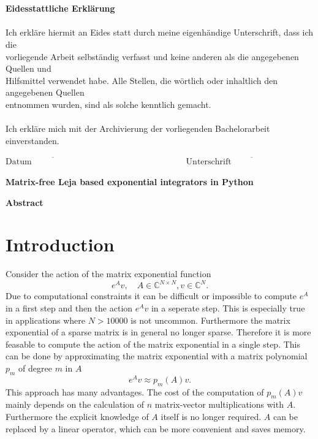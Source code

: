 \documentclass{scrartcl}
\begin{document}
{\begin{figure}[!htp]
\begin{flushright}
\end{flushright}
\end{figure}\\\\
{\Large\textbf{Eidesstattliche Erklärung}}\\\\
Ich erkläre hiermit an Eides statt durch meine eigenhändige Unterschrift, dass ich die\\ vorliegende Arbeit selbständig verfasst und keine anderen als die angegebenen Quellen und\\ Hilfsmittel verwendet habe. Alle Stellen, die wörtlich oder inhaltlich den angegebenen Quellen \\entnommen wurden, sind als solche kenntlich gemacht.\\\\
Ich erkläre mich mit der Archivierung der vorliegenden Bachelorarbeit einverstanden.
\vspace{40pt}\\
\begin{center}
\ensuremath{\overline{\mbox{Datum}\hspace{8em}}
    \hspace{10em}
    \overline{\mbox{Unterschrift}\hspace{10em}}
}
\thispagestyle{empty}
\end{center}}
\pagebreak



\begin{center}\textbf{\Huge Matrix-free Leja based exponential integrators in Python}\end{center}
\begin{center}\textbf{Abstract}\end{center}
\begin{abstract}

\end{abstract}

\setcounter{page}{1}

\section{Introduction}
Consider the action of the matrix exponential function 
	\[e^Av,\quad A\in\mathbb{C}^{N\times N}, v\in\mathbb{C}^N.\] 
Due to computational constraints it can be difficult or impossible to compute $e^A$ in a first step and then the action $e^Av$ in a seperate step. This is especially true in applications where $N>10000$ is not uncommon. Furthermore the matrix exponential of a sparse matrix is in general no longer sparse. Therefore it is more feasable to compute the action of the matrix exponential in a single step. This can be done by approximating the matrix exponential with a matrix polynomial $p_m$ of degree $m$ in $A$
	\[e^Av \approx p_m(A)v.\]
This approach has many advantages. The cost of the computation of $p_m(A)v$ mainly depends on the calculation of $n$ matrix-vector multiplications with $A$. Furthermore the explicit knowledge of $A$ itself is no longer required. $A$ can be replaced by a linear operator, which can be more convenient and saves memory.
\end{document}
